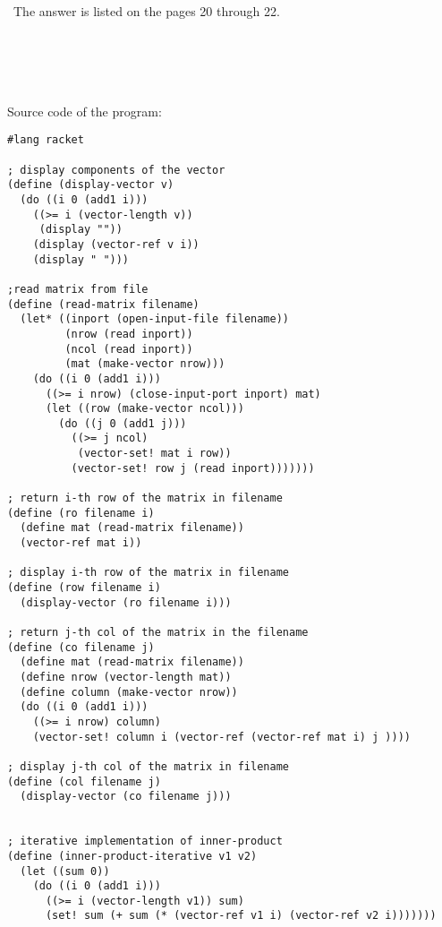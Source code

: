 \documentclass{article}
\begin{document}
\paragraph{}\
\paragraph{}\
	The answer is listed on the pages 20 through 22.
\paragraph{}\
\paragraph{}\

Source code of the program:

\begin{verbatim}
#lang racket

; display components of the vector
(define (display-vector v)
  (do ((i 0 (add1 i)))
    ((>= i (vector-length v))
     (display ""))
    (display (vector-ref v i))
    (display " ")))

;read matrix from file
(define (read-matrix filename)
  (let* ((inport (open-input-file filename))
         (nrow (read inport))
         (ncol (read inport))
         (mat (make-vector nrow)))
    (do ((i 0 (add1 i)))
      ((>= i nrow) (close-input-port inport) mat)
      (let ((row (make-vector ncol)))
        (do ((j 0 (add1 j)))
          ((>= j ncol)
           (vector-set! mat i row))
          (vector-set! row j (read inport)))))))

; return i-th row of the matrix in filename
(define (ro filename i)
  (define mat (read-matrix filename))
  (vector-ref mat i))

; display i-th row of the matrix in filename
(define (row filename i)
  (display-vector (ro filename i)))

; return j-th col of the matrix in the filename
(define (co filename j)
  (define mat (read-matrix filename))
  (define nrow (vector-length mat))
  (define column (make-vector nrow))
  (do ((i 0 (add1 i)))
    ((>= i nrow) column)
    (vector-set! column i (vector-ref (vector-ref mat i) j ))))

; display j-th col of the matrix in filename
(define (col filename j)
  (display-vector (co filename j)))


; iterative implementation of inner-product
(define (inner-product-iterative v1 v2)
  (let ((sum 0))
    (do ((i 0 (add1 i)))
      ((>= i (vector-length v1)) sum)
      (set! sum (+ sum (* (vector-ref v1 i) (vector-ref v2 i)))))))


\end{verbatim}
\end{document}
